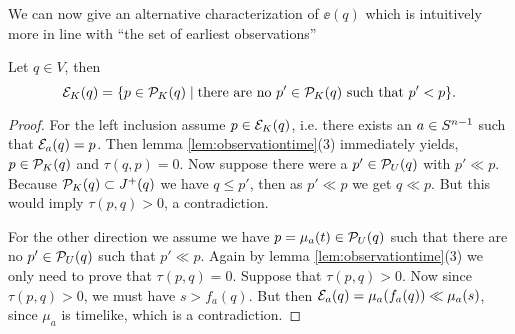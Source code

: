 We can now give an alternative characterization of $\ee(q)$ which is intuitively more in line with \enquote{the set of earliest observations}
\begin{proposition}\label{prop:seocharact}
Let $q\in V$, then 
\begin{equation*}
    \mc{E}_K(q) = \{ p \in \P_K(q) \mid \text{there are no $p'\in \P_K(q)$ such that $p' < p$} \}.
\end{equation*}
\end{proposition}
\begin{proof}
For the left inclusion assume $p\in \mc{E}_K(q)$, i.e. there exists an $a\in \sn$ such that $\mc{E}_a(q)=p$. Then lemma \ref{lem:observationtime}(3) immediately yields, $p\in \P_K(q)$ and  $\tau(q,p)=0$. Now suppose there were a $p'\in \P_U(q)$ with $p'\ll p$. Because $\P_K(q)\subset J^+(q)$ we have $q\leq p'$, then as $p'\ll p$ we get $q\ll p$. But this would imply $\tau(p,q)>0$, a contradiction.

For the other direction we assume we have $p=\mu_a(t) \in \P_U(q)$ such that there are no $p'\in\P_U(q)$ such that $p'\ll p$. Again by lemma \ref{lem:observationtime}(3) we only need to prove that $\tau(p,q)=0$. Suppose that $\tau(p,q)>0$. Now since $\tau(p,q)>0$, we must have $s > f_a(q)$. But then $\mc{E}_a(q) = \mu_a(f_a(q)) \ll  \mu_a(s)$, since $\mu_a$ is timelike, which is a contradiction.
\end{proof}


